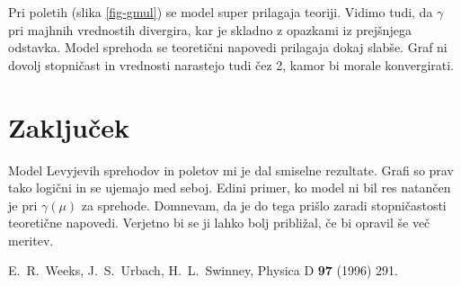 \documentclass[a4paper, 12pt, slovene]{article}
\begin{document}
Pri poletih (slika \ref{fig-gmul}) se model super prilagaja teoriji. Vidimo tudi, da $\gamma$ pri majhnih vrednostih divergira, kar je skladno z opazkami iz prejšnjega odstavka. Model sprehoda se teoretični napovedi prilagaja dokaj slabše. Graf ni dovolj stopničast in vrednosti narastejo tudi čez 2, kamor bi morale konvergirati.


\section{Zaključek}
Model Levyjevih sprehodov in poletov mi je dal smiselne rezultate. Grafi so prav tako logični in se ujemajo med seboj. Edini primer, ko model ni bil res natančen je pri $\gamma(\mu)$ za sprehode. Domnevam, da je do tega prišlo zaradi stopničastosti teoretične napovedi. Verjetno bi se ji lahko bolj približal, če bi opravil še več meritev. 








\begin{thebibliography}{99}
\setlength{\itemsep}{.2\itemsep}\setlength{\parsep}{.5\parsep}
 E.~R.~Weeks, J.~S.~Urbach, H.~L.~Swinney, Physica D {\bf 97} (1996) 291.
\end{thebibliography}
\end{document}
